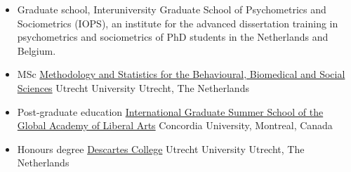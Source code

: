 \documentclass[
  letterpaper,
  DIV=11,
  numbers=noendperiod,
  oneside]{scrartcl}
\providecommand{\tightlist}{%
  \setlength{\itemsep}{0pt}\setlength{\parskip}{0pt}}\usepackage{longtable,booktabs,array}
\begin{document}
{}

\begin{itemize}
\tightlist
\item
  Graduate school, Interuniversity Graduate School of Psychometrics and
  Sociometrics (IOPS), an institute for the advanced dissertation
  training in psychometrics and sociometrics of PhD students in the
  Netherlands and Belgium.
\end{itemize}

{}

\begin{itemize}
\tightlist
\item
  MSc
  \href{https://www.uu.nl/en/masters/methodology-and-statistics-behavioural-biomedical-and-social-sciences}{Methodology
  and Statistics for the Behavioural, Biomedical and Social Sciences}
  \textbar{} Utrecht University \textbar{} Utrecht, The Netherlands
\end{itemize}

{}

\begin{itemize}
\item
  Post-graduate education
  \href{https://www.concordia.ca/summer/artsci/Previous-Summer-Schools/2018/GALA2018.html}{International
  Graduate Summer School of the Global Academy of Liberal Arts}
  \textbar{} Concordia University, Montreal, Canada
\end{itemize}

{}

\begin{itemize}
\item
  Honours degree
  \href{https://students.uu.nl/en/academics/honours/programmes/descartes-college}{Descartes
  College} \textbar{} Utrecht University \textbar{} Utrecht, The
  Netherlands
\end{itemize}

{}
\end{document}
